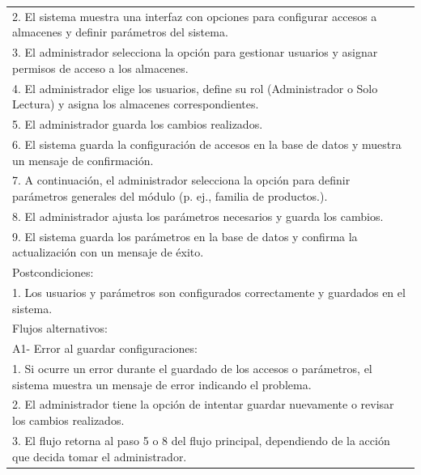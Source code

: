 \documentclass[stu, 12pt, letterpaper, donotrepeattitle, floatsintext, natbib]{apa7}
\begin{document}
\begin{longtable}{@{} p{16.5cm} @{}}
    2. El sistema muestra una interfaz con opciones para configurar accesos a almacenes y definir parámetros del sistema.                            \\
    3. El administrador selecciona la opción para gestionar usuarios y asignar permisos de acceso a los almacenes.                                   \\
    4. El administrador elige los usuarios, define su rol (Administrador o Solo Lectura) y asigna los almacenes correspondientes.                    \\
    5. El administrador guarda los cambios realizados.                                                                                               \\
    6. El sistema guarda la configuración de accesos en la base de datos y muestra un mensaje de confirmación.                                       \\
    7. A continuación, el administrador selecciona la opción para definir parámetros generales del módulo (p. ej., familia de productos.).           \\
    8. El administrador ajusta los parámetros necesarios y guarda los cambios.                                                                       \\
    9. El sistema guarda los parámetros en la base de datos y confirma la actualización con un mensaje de éxito.                                     \\ \midrule
    Postcondiciones:                                                                                                                                 \\
    1. Los usuarios y parámetros son configurados correctamente y guardados en el sistema.                                                           \\ \midrule
    Flujos alternativos:                                                                                                                             \\
    A1- Error al guardar configuraciones:                                                                                                            \\
    \hspace{1cm}1. Si ocurre un error durante el guardado de los accesos o parámetros, el sistema muestra un mensaje de error indicando el problema. \\
    \hspace{1cm}2. El administrador tiene la opción de intentar guardar nuevamente o revisar los cambios realizados.                                 \\
    \hspace{1cm}3. El flujo retorna al paso 5 o 8 del flujo principal, dependiendo de la acción que decida tomar el administrador.                   \\ \bottomrule
\end{longtable}
\end{document}
